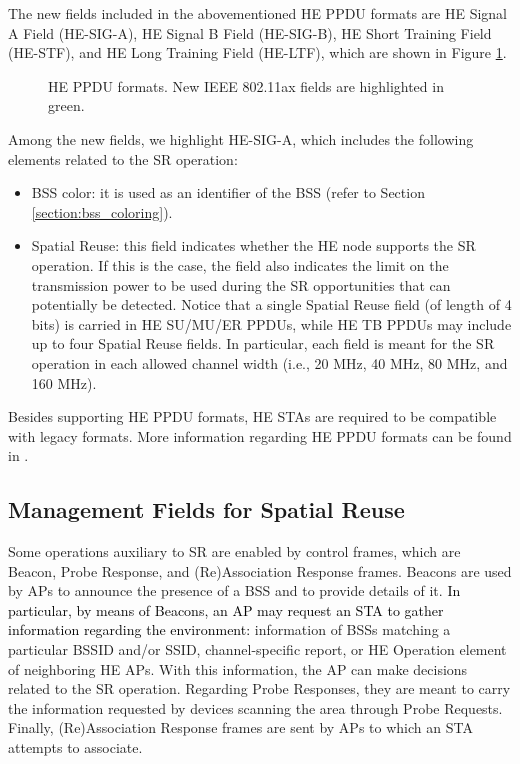\documentclass[preprint,12pt]{elsarticle}
\theoremstyle{plain}
\begin{document}
The new fields included in the abovementioned HE PPDU formats are HE Signal A Field (HE-SIG-A), HE Signal B Field (HE-SIG-B), HE Short Training Field (HE-STF), and HE Long Training Field (HE-LTF), which are shown in Figure \ref{fig:appendix_1}.
\begin{figure}[ht!]
	\centering
	\caption{HE PPDU formats. New IEEE 802.11ax fields are highlighted in green.}
	\label{fig:appendix_1}
\end{figure}

Among the new fields, we highlight HE-SIG-A, which includes the following elements related to the SR operation:
\begin{itemize}
	\item BSS color: it is used as an identifier of the BSS (refer to Section \ref{section:bss_coloring}).
	\item Spatial Reuse: this field indicates whether the HE node supports the SR operation. If this is the case, the field also indicates the limit on the transmission power to be used during the SR opportunities that can potentially be detected. Notice that a single Spatial Reuse field (of length of 4 bits) is carried in HE SU/MU/ER PPDUs,  while HE TB PPDUs may include up to four Spatial Reuse fields. In particular, each field is meant for the SR operation in each allowed channel width (i.e., 20 MHz, 40 MHz, 80 MHz, and 160 MHz).
\end{itemize}

Besides supporting HE PPDU formats, HE STAs are required to be compatible with legacy formats. More information regarding HE PPDU formats can be found in \cite{rhode2017whitepaper}. 

\subsection{Management Fields for Spatial Reuse}
Some operations auxiliary to SR are enabled by control frames, which are Beacon, Probe Response, and (Re)Association Response frames. Beacons are used by APs to announce the presence of a BSS and to provide details of it. \textcolor{black}{In particular, by means of Beacons, an AP may request an STA to gather information regarding the environment:} information of BSSs matching a particular BSSID and/or SSID, channel-specific report, or HE Operation element of neighboring HE APs. With this information, the AP can make decisions related to the SR operation. Regarding Probe Responses, they are meant to carry the information requested by devices scanning the area through Probe Requests. Finally, (Re)Association Response frames are sent by APs to which an STA attempts to associate.
\end{document}

